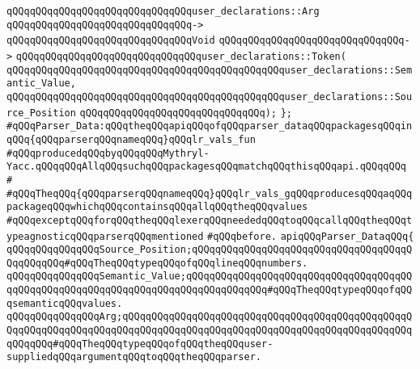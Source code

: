 \verb|qQQqqQQqqQQqqQQqqQQqqQQqqQQqqQQquser_declarations::Arg|\newline
\verb|qQQqqQQqqQQqqQQqqQQqqQQqqQQqqQQq->|\newline
\verb|qQQqqQQqqQQqqQQqqQQqqQQqqQQqqQQqVoid|\newline
\verb|qQQqqQQqqQQqqQQqqQQqqQQqqQQqqQQq->|\newline
\verb|qQQqqQQqqQQqqQQqqQQqqQQqqQQqqQQquser_declarations::Token(|\newline
\verb|qQQqqQQqqQQqqQQqqQQqqQQqqQQqqQQqqQQqqQQqqQQqqQQquser_declarations::Semantic_Value,|\newline
\verb|qQQqqQQqqQQqqQQqqQQqqQQqqQQqqQQqqQQqqQQqqQQqqQQquser_declarations::Source_Position|\newline
\verb|qQQqqQQqqQQqqQQqqQQqqQQqqQQqqQQq);|\newline
\verb|};|\newline
\newline
\verb|#qQQqParser_Data:qQQqtheqQQqapiqQQqofqQQqparser_dataqQQqpackagesqQQqinqQQq{qQQqparserqQQqnameqQQq}qQQqlr_vals_fun|\newline
\verb|#qQQqproducedqQQqbyqQQqqQQqMythryl-Yacc.qQQqqQQqAllqQQqsuchqQQqpackagesqQQqmatchqQQqthisqQQqapi.qQQqqQQq|\newline
\verb|#|\newline
\verb|#qQQqTheqQQq{qQQqparserqQQqnameqQQq}qQQqlr_vals_gqQQqproducesqQQqaqQQqpackageqQQqwhichqQQqcontainsqQQqallqQQqtheqQQqvalues|\newline
\verb|#qQQqexceptqQQqforqQQqtheqQQqlexerqQQqneededqQQqtoqQQqcallqQQqtheqQQqtypeagnosticqQQqparserqQQqmentioned|\newline
\verb|#qQQqbefore.|\newline
\newline
\newline
\verb|apiqQQqParser_DataqQQq{|\newline
\newline
\verb|qQQqqQQqqQQqqQQqSource_Position;qQQqqQQqqQQqqQQqqQQqqQQqqQQqqQQqqQQqqQQqqQQqqQQq#qQQqTheqQQqtypeqQQqofqQQqlineqQQqnumbers.|\newline
\verb|qQQqqQQqqQQqqQQqSemantic_Value;qQQqqQQqqQQqqQQqqQQqqQQqqQQqqQQqqQQqqQQqqQQqqQQqqQQqqQQqqQQqqQQqqQQqqQQqqQQqqQQqqQQq#qQQqTheqQQqtypeqQQqofqQQqsemanticqQQqvalues.|\newline
\verb|qQQqqQQqqQQqqQQqArg;qQQqqQQqqQQqqQQqqQQqqQQqqQQqqQQqqQQqqQQqqQQqqQQqqQQqqQQqqQQqqQQqqQQqqQQqqQQqqQQqqQQqqQQqqQQqqQQqqQQqqQQqqQQqqQQqqQQqqQQqqQQqqQQq#qQQqTheqQQqtypeqQQqofqQQqtheqQQquser-suppliedqQQqargumentqQQqtoqQQqtheqQQqparser.|\newline
